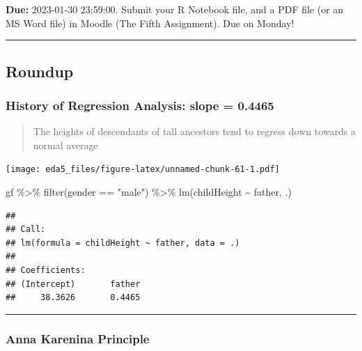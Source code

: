 \documentclass[
]{article}
\newenvironment{Shaded}{\begin{snugshade}}{\end{snugshade}}
\newcommand{\FunctionTok}[1]{\textcolor[rgb]{0.00,0.00,0.00}{#1}}
\newcommand{\NormalTok}[1]{#1}
\newcommand{\SpecialCharTok}[1]{\textcolor[rgb]{0.00,0.00,0.00}{#1}}
\newcommand{\StringTok}[1]{\textcolor[rgb]{0.31,0.60,0.02}{#1}}
\begin{document}
\textbf{Due:} 2023-01-30 23:59:00. Submit your R Notebook file, and a
PDF file (or an MS Word file) in Moodle (The Fifth Assignment). Due on
Monday!

\begin{center}\rule{0.5\linewidth}{0.5pt}\end{center}

\hypertarget{roundup}{%
\subsection{Roundup}\label{roundup}}

\hypertarget{history-of-regression-analysis-slope-0.4465}{%
\subsubsection{History of Regression Analysis: slope =
0.4465}\label{history-of-regression-analysis-slope-0.4465}}

\begin{quote}
The heights of descendants of tall ancestors tend to regress down
towards a normal average
\end{quote}

\texttt{[image: eda5\_files/figure-latex/unnamed-chunk-61-1.pdf]}

\begin{Shaded}
\begin{Highlighting}[]
\NormalTok{gf }\SpecialCharTok{\%\textgreater{}\%} \FunctionTok{filter}\NormalTok{(gender }\SpecialCharTok{==} \StringTok{"male"}\NormalTok{) }\SpecialCharTok{\%\textgreater{}\%} \FunctionTok{lm}\NormalTok{(childHeight }\SpecialCharTok{\textasciitilde{}}\NormalTok{ father, .)}
\end{Highlighting}
\end{Shaded}

\begin{verbatim}
## 
## Call:
## lm(formula = childHeight ~ father, data = .)
## 
## Coefficients:
## (Intercept)       father  
##     38.3626       0.4465
\end{verbatim}

\begin{center}\rule{0.5\linewidth}{0.5pt}\end{center}

\hypertarget{anna-karenina-principle}{%
\subsubsection{Anna Karenina Principle}\label{anna-karenina-principle}}
\end{document}
